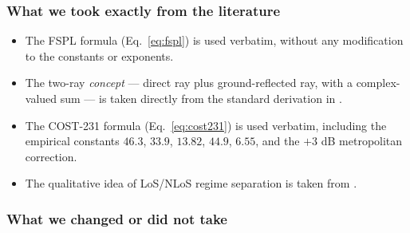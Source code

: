 \documentclass[11pt,a4paper]{article}
\begin{document}
\subsubsection{What we took exactly from the literature}

\begin{itemize}
\item The FSPL formula (Eq.~\ref{eq:fspl}) is used verbatim, without any
      modification to the constants or exponents.
\item The two-ray \emph{concept} — direct ray plus ground-reflected ray,
      with a complex-valued sum — is taken directly from the standard derivation
      in \cite{rappaport,wocc2021}.
\item The COST-231 formula (Eq.~\ref{eq:cost231}) is used verbatim, including
      the empirical constants $46.3$, $33.9$, $13.82$, $44.9$, $6.55$, and the
      $+3$ dB metropolitan correction.
\item The qualitative idea of LoS/NLoS regime separation is taken from
      \cite{tr38901,khawaja_survey}.
\end{itemize}

\subsubsection{What we changed or did not take}
\end{document}
